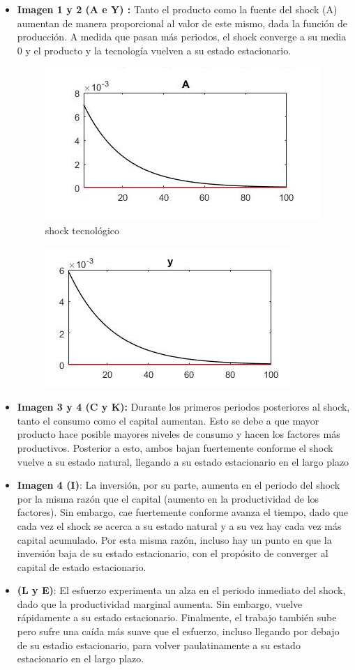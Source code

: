 \documentclass{article}
\begin{document}
	\begin{itemize}
		
		\item \textbf{Imagen 1 y 2 (A e Y) :} Tanto el producto como la fuente del shock (A) aumentan de manera proporcional al valor de este mismo, dada la función de producción. A medida que pasan más periodos, el shock converge a su media 0 y el producto y la tecnología vuelven a su estado estacionario.
		\begin{figure}[h]
			\centering
			\includegraphics[width=0.5\linewidth]{a_1}
			\caption{shock tecnológico}
			\label{fig:a1}
		\end{figure}
		
		\begin{figure}[h]
			\centering
			\includegraphics[width=0.4\linewidth]{y_2}
			\caption{}
			\label{fig:a1}
		\end{figure}
		\newpage
		\item \textbf{Imagen 3 y 4 (C y K):} Durante los primeros periodos posteriores al shock, tanto el consumo como el capital aumentan. Esto se debe a que mayor producto hace posible mayores niveles de consumo y hacen los factores más productivos. Posterior a esto, ambos bajan fuertemente conforme el shock vuelve a su estado natural, llegando a su estado estacionario en el largo plazo
		
	
		
		
		\item \textbf{Imagen 4 (I)}: La inversión, por su parte, aumenta en el periodo del shock por la misma razón que el capital (aumento en la productividad de los factores). Sin embargo, cae fuertemente conforme avanza el tiempo,  dado que cada vez el shock se acerca a su estado natural y a su vez hay cada vez más capital acumulado. Por esta misma razón, incluso hay un punto en que la inversión baja de su estado estacionario, con el propósito de converger al capital de estado estacionario.
	
		
		\item \textbf{(L y E)}: El esfuerzo experimenta un alza en el periodo inmediato del shock, dado que la productividad marginal aumenta. Sin embargo, vuelve rápidamente a su estado estacionario. Finalmente, el trabajo también sube pero sufre una caída más suave que el esfuerzo, incluso llegando por debajo de su estadio estacionario, para volver paulatinamente a su estado estacionario en el largo plazo.
		
	
		
	\end{itemize}
\end{document}
